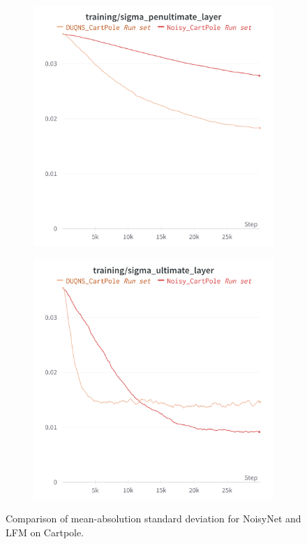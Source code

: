 \documentclass[]{uai2021} %
\begin{document}
\begin{figure}
    \centering
    \begin{subfigure}[b]{0.45\columnwidth}
        \centering
        \includegraphics[width=\columnwidth]{charts/penult}
    \end{subfigure}
    \begin{subfigure}[b]{0.45\columnwidth}
        \centering
        \includegraphics[width=\columnwidth]{charts/ult}
    \end{subfigure}
    \caption{Comparison of mean-absolution standard deviation for NoisyNet and LFM
    on Cartpole.}
    \label{fig:mean_std}
\end{figure}
\end{document}
